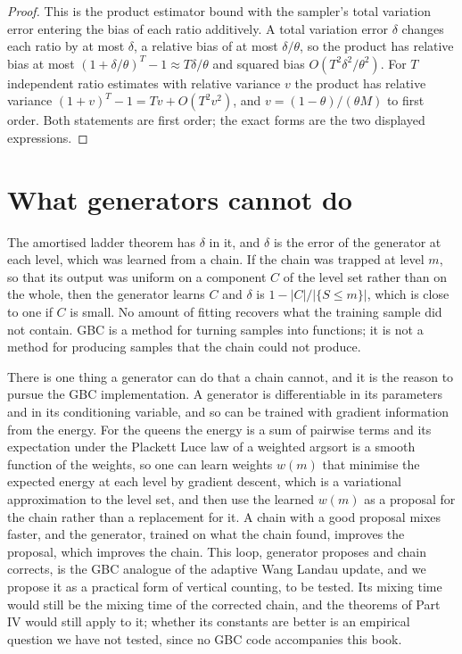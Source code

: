 \begin{proof}
This is the product estimator bound with the sampler's total variation error entering the bias of each ratio additively. A total variation error $\delta$ changes each ratio by at most $\delta$, a relative bias of at most $\delta/\theta$, so the product has relative bias at most $(1 + \delta/\theta)^T - 1 \approx T\delta/\theta$ and squared bias $O(T^2\delta^2/\theta^2)$. For $T$ independent ratio estimates with relative variance $v$ the product has relative variance $(1 + v)^T - 1 = Tv + O(T^2 v^2)$, and $v = (1 - \theta)/(\theta M)$ to first order. Both statements are first order; the exact forms are the two displayed expressions.
\end{proof}

\section{What generators cannot do}

The amortised ladder theorem has $\delta$ in it, and $\delta$ is the error of the generator at each level, which was learned from a chain. If the chain was trapped at level $m$, so that its output was uniform on a component $C$ of the level set rather than on the whole, then the generator learns $C$ and $\delta$ is $1 - |C| / |\{ S \le m \}|$, which is close to one if $C$ is small. No amount of fitting recovers what the training sample did not contain. GBC is a method for turning samples into functions; it is not a method for producing samples that the chain could not produce.

There is one thing a generator can do that a chain cannot, and it is the reason to pursue the GBC implementation. A generator is differentiable in its parameters and in its conditioning variable, and so can be trained with gradient information from the energy. For the queens the energy is a sum of pairwise terms and its expectation under the Plackett Luce law of a weighted argsort is a smooth function of the weights, so one can learn weights $w(m)$ that minimise the expected energy at each level by gradient descent, which is a variational approximation to the level set, and then use the learned $w(m)$ as a proposal for the chain rather than a replacement for it. A chain with a good proposal mixes faster, and the generator, trained on what the chain found, improves the proposal, which improves the chain. This loop, generator proposes and chain corrects, is the GBC analogue of the adaptive Wang Landau update, and we propose it as a practical form of vertical counting, to be tested. Its mixing time would still be the mixing time of the corrected chain, and the theorems of Part IV would still apply to it; whether its constants are better is an empirical question we have not tested, since no GBC code accompanies this book.

